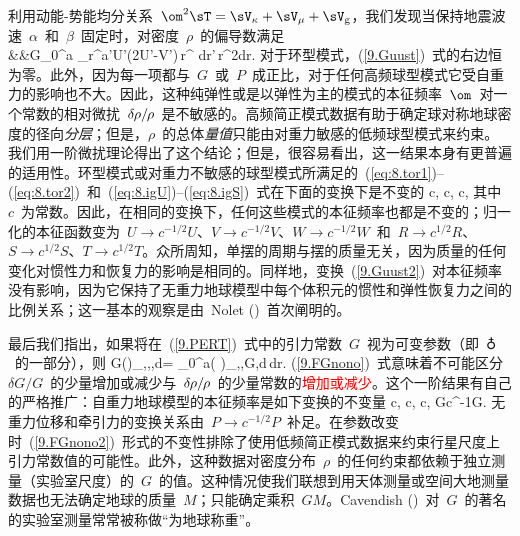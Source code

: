 利用动能-势能均分关系~$\om^2\sT=\sV_{\kappa}+\sV_{\mu}+\sV_{\rm g}$，我们发现当保持地震波速~$\alpha$~和~$\beta$~固定时，对密度~$\rho$~的偏导数满足
\eqa \label{9.Guust} 
\nonumber \\
&&\mbox{}\qquad{}\pi G\int_0^a\!
\int_r^a\rho'U'(2U'-\sqL V')\,r^{}
dr'\,r^2dr.
\ena
对于环型模式，(\ref{9.Guust})~式的右边恒为零。此外，因为每一项都与~$G$~或~$P$~成正比，对于任何高频球型模式它受自重力的影响也不大。因此，这种纯弹性或是以弹性为主的模式的本征频率~$\om$~对一个常数的相对微扰~$\delta\hspace{-0.2 mm}\rho/\hspace{-0.3 mm}\rho$~是不敏感的。高频简正模式数据有助于确定球对称地球密度的径向{\em 分层\/}；但是，$\rho$~的总体{\em 量值\/}只能由对重力敏感的低频球型模式来约束。我们用一阶微扰理论得出了这个结论；但是，很容易看出，这一结果本身有更普遍的适用性。环型模式或对重力不敏感的球型模式所满足的~(\ref{eq:8.tor1})--(\ref{eq:8.tor2})~和~(\ref{eq:8.igU})--(\ref{eq:8.igS})~式在下面的变换下是不变的
\eq \label{9.Guust2}
\rho\rightarrow c\rho,\qquad
\kappa\rightarrow c\kappa,\qquad
\mu\rightarrow c\mu,
\en
其中~$c$~为常数。因此，在相同的变换下，任何这些模式的本征频率也都是不变的；归一化的本征函数变为~$U\rightarrow c^{-1/2}U$、$V\rightarrow c^{-1/2}V$、$W\rightarrow c^{-1/2}W$~和~$R\rightarrow c^{1/2}R$、$S\rightarrow c^{1/2}S$、$T\rightarrow c^{1/2}T$。众所周知，单摆的周期与摆的质量无关，因为质量的任何变化对惯性力和恢复力的影响是相同的。同样地，变换~(\ref{9.Guust2})~对本征频率没有影响，因为它保持了无重力地球模型中每个体积元的惯性和弹性恢复力之间的比例关系；这一基本的观察是由~Nolet (\citeyear{nolet76})~首次阐明的。

最后我们指出，如果将在~(\ref{9.PERT})~式中的引力常数~$G$~视为可变参数（即~$\earth$~的一部分），则
%
%
\eq \label{9.FGnono}
G\left(\right)_{\alpha,\beta,\rho,d}=
\int_0^a\rho\left(\frac{\p\om}
{\p\hspace{-0.2 mm}\rho}\right)_{\alpha,\beta,G,d}\,dr.
\en
(\ref{9.FGnono})~式意味着不可能区分~$\delta G/G$~的少量增加或减少与~$\delta\hspace{-0.2 mm}\rho/\hspace{-0.3 mm}\rho$~的少量常数的\textcolor{red}{增加或减少}。这个一阶结果有自己的严格推广：自重力地球模型的本征频率是如下变换的不变量
\eq \label{9.FGnono2}
\rho\rightarrow c\rho,\qquad
\kappa\rightarrow c\kappa,\qquad
\mu\rightarrow c\mu,\qquad
G\rightarrow c^{-1}G.
\en
无重力位移和牵引力的变换关系由~$P\rightarrow c^{-1/2}P$~补足。在参数改变时~(\ref{9.FGnono2})~形式的不变性排除了使用低频简正模式数据来约束行星尺度上引力常数值的可能性。此外，这种数据对密度分布~$\rho$~的任何约束都依赖于独立测量（实验室尺度）的~$G$~的值。这种情况使我们联想到用天体测量或空间大地测量数据也无法确定地球的质量~$M$；只能确定乘积~$GM$。Cavendish (\citeyear{cavendish1798})~对~$G$~的著名的实验室测量常常被称做“为地球称重”。
%
%
%

